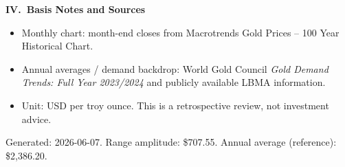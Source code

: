 \documentclass[11pt,a4paper]{article}
\newcommand{\secgold}[1]{%
  \vspace{0.55em}%
  {\large\color{sectiongold}\textbf{#1}}\par
  \vspace{0.15em}%
}
\begin{document}
\secgold{IV.\ Basis Notes and Sources}

{\small
\begin{itemize}
  \setlength{\itemsep}{0.25em}
  \setlength{\parsep}{0pt}
  \item Monthly chart: month-end closes from Macrotrends Gold Prices -- 100 Year Historical Chart.
  \item Annual averages / demand backdrop: World Gold Council \emph{Gold Demand Trends: Full Year 2023/2024} and publicly available LBMA information.
  \item Unit: USD per troy ounce. This is a retrospective review, not investment advice.
\end{itemize}

\vspace{0.4em}
{\color{muted}Generated: 2026-06-07. Range amplitude: \$707.55. Annual average (reference): \$2,386.20.}
}
\end{document}
